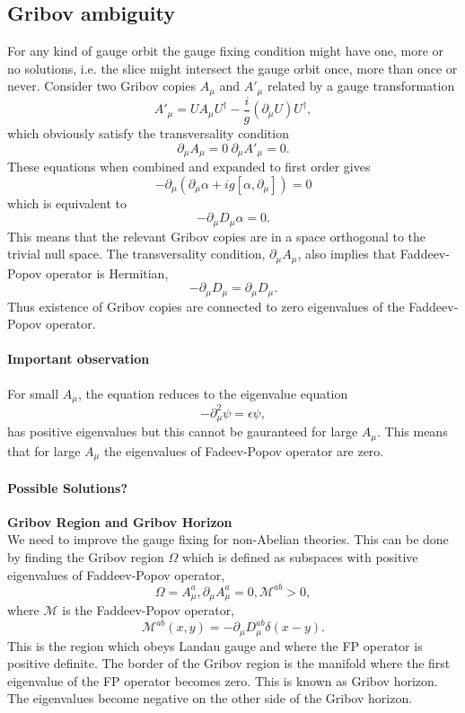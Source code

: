 \subsection{Gribov ambiguity}

For any kind of gauge orbit the gauge fixing condition might have one, more or no solutions, i.e. the slice might intersect the gauge orbit once, more than once or never. Consider two Gribov copies $A_{\mu}$ and $A'_{\mu}$ related by a gauge transformation $$ A'_{\mu}=U A_{\mu} U^{\dagger}-\frac{i}{g}(\partial_{\mu}U)U^{\dagger},$$ which obviously satisfy the transversality condition $$\partial_{\mu}A_{\mu}=0 \ \partial_{\mu}A'_{\mu}=0. $$ These equations when combined and expanded to first order gives $$ -\partial_{\mu}(\partial_{\mu}\alpha+i g [\alpha,\partial_{\mu}])=0 $$ which is equivalent to $$-\partial_{\mu}D_{\mu} \alpha  =0.$$ This means that the relevant Gribov copies are in a space orthogonal to the trivial null space. The transversality condition, $\partial_{\mu}A_{\mu}$, also implies that Faddeev-Popov operator is Hermitian, $$-\partial_{\mu}D_{\mu}=\partial_{\mu}D_{\mu}.$$ Thus existence of Gribov copies are connected to zero eigenvalues of the Faddeev-Popov operator.

\paragraph{Important observation}
For small $A_{\mu}$, the equation reduces to the eigenvalue equation $$-\partial^{2}_{\mu}\psi=\epsilon \psi,$$ has positive eigenvalues but this cannot be gauranteed for large $A_{\mu}$. This means that for large $A_{\mu}$ the eigenvalues of Fadeev-Popov operator are zero.


\paragraph{Possible Solutions?}
\textbf{Gribov Region and Gribov Horizon}\\
We need to improve the gauge fixing for non-Abelian theories. This can
be done by finding the Gribov region $\Omega$ which is defined as
subspaces with positive eigenvalues of Faddeev-Popov operator, $$\Omega
= {A^{a}_{\mu},\partial_{\mu}A^{a}_{\mu}=0, \mathcal{M}^{ab}>0},$$
where $\mathcal{M}$ is the Faddeev-Popov operator,
$$\mathcal{M}^{ab}(x,y)=-\partial_{\mu}D^{ab}_{\mu}\delta(x-y).$$ This is
the region which obeys Landau gauge and where the FP operator is positive
definite. The border of the Gribov region is the manifold where the first
eigenvalue of the FP operator becomes zero. This is known as Gribov
horizon. The eigenvalues become negative on the other side of the Gribov
horizon.

